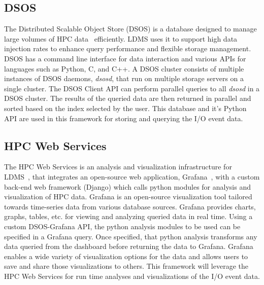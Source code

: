 \subsection{DSOS}
The Distributed Scalable Object Store (DSOS) is a database designed to manage large volumes of HPC data~\cite{sosgithub} efficiently. LDMS uses it to support high data injection rates to enhance query performance and flexible storage management. 
DSOS has a command line interface for data interaction and various APIs for languages such as Python, C, and C++. A DSOS cluster consists of multiple instances of DSOS daemons, \emph{dsosd}, that run on multiple storage servers on a single cluster. The DSOS Client API can perform parallel queries to all \emph{dsosd} in a DSOS cluster. The results of the queried data are then returned in parallel and sorted based on the index selected by the user. This database and it's Python API are used in this framework for storing and querying the I/O event data. 
\subsection{HPC Web Services}
The HPC Web Services is an analysis and visualization infrastructure for LDMS~\cite{ClusterAV}, that integrates an open-source web application, Grafana~\cite{grafana-website}, with a custom back-end web framework (Django)  which calls python modules for analysis and visualization of HPC data. Grafana is an open-source visualization tool tailored towards time-series data from various database sources. Grafana provides charts, graphs, tables, etc. for viewing and analyzing queried data in real time. Using a custom DSOS-Grafana API, the python analysis modules to be used can be specified in a Grafana query. Once specified, that python analysis transforms any data queried from the dashboard before returning the data to Grafana. Grafana enables a wide variety of visualization options for the data and allows users to save and share those visualizations to others. This framework will leverage the HPC Web Services for run time analyses and visualizations of the I/O event data.

